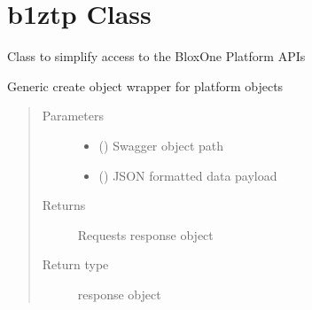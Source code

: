 \documentclass[letterpaper,10pt,english]{sphinxmanual}
\begin{document}
\section{b1ztp Class}
\label{\detokenize{b1ztp-class:b1ztp-class}}\label{\detokenize{b1ztp-class::doc}}

\begin{fulllineitems}
\label{\detokenize{b1ztp-class:bloxone.b1ztp}}
\sphinxAtStartPar
Class to simplify access to the BloxOne Platform APIs

\begin{fulllineitems}
\label{\detokenize{b1ztp-class:bloxone.b1ztp.create}}
\sphinxAtStartPar
Generic create object wrapper for platform objects
\begin{quote}\begin{description}
\item[{Parameters}] \leavevmode\begin{itemize}
\item {} 
\sphinxAtStartPar
{} () \textendash{} Swagger object path

\item {} 
\sphinxAtStartPar
{} () \textendash{} JSON formatted data payload

\end{itemize}

\item[{Returns}] \leavevmode
\sphinxAtStartPar
Requests response object

\item[{Return type}] \leavevmode
\sphinxAtStartPar
response object

\end{description}\end{quote}


\end{fulllineitems}
\end{fulllineitems}
\end{document}
